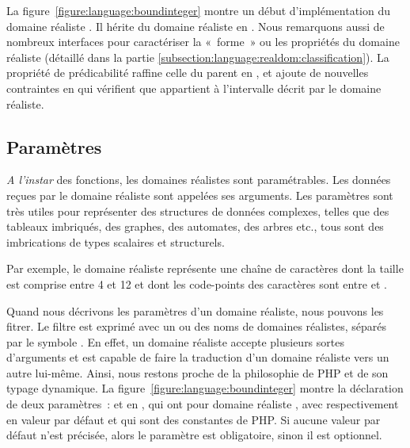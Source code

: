 La figure~\ref{figure:language:boundinteger} montre un début d'implémentation du
domaine réaliste . Il hérite du domaine réaliste
 en . Nous remarquons aussi de nombreux interfaces pour
caractériser la «~forme~» ou les propriétés du domaine réaliste (détaillé dans
la partie \ref{subsection:language:realdom:classification}). La propriété de
prédicabilité raffine celle du parent en , et ajoute de nouvelles
contraintes en  qui vérifient que  appartient à
l'intervalle décrit par le domaine réaliste.

\subsection{Paramètres}
\label{subsection:language:realdom:parameters}

{\em A l'instar} des fonctions, les domaines réalistes sont {\strong
paramétrables}. Les données reçues par le domaine réaliste sont appelées ses
{\strong arguments}. Les paramètres sont très utiles pour représenter des
structures de données complexes, telles que des tableaux imbriqués, des graphes,
des automates, des arbres etc., tous sont des imbrications de types scalaires et
structurels.

\begin{example}

Par exemple, le domaine réaliste 
représente une chaîne de caractères dont la taille est comprise entre 4 et 12 et
dont les code-points des caractères sont entre  et .

\end{example}

Quand nous décrivons les paramètres d'un domaine réaliste, nous pouvons les
fitrer. Le filtre est exprimé avec un ou des noms de domaines réalistes, séparés
par le symbole \code{$\vert$}. En effet, un domaine réaliste accepte plusieurs
sortes d'arguments et est capable de faire la traduction d'un domaine réaliste
vers un autre lui-même. Ainsi, nous restons proche de la philosophie de PHP et
de son typage dynamique. La figure~\ref{figure:language:boundinteger} montre la
déclaration de deux paramètres~:  et  en ,
qui ont pour domaine réaliste , avec respectivement en valeur
par défaut  et  qui sont des constantes
de PHP. Si aucune valeur par défaut n'est précisée, alors le paramètre est
{\strong obligatoire}, sinon il est {\strong optionnel}.

